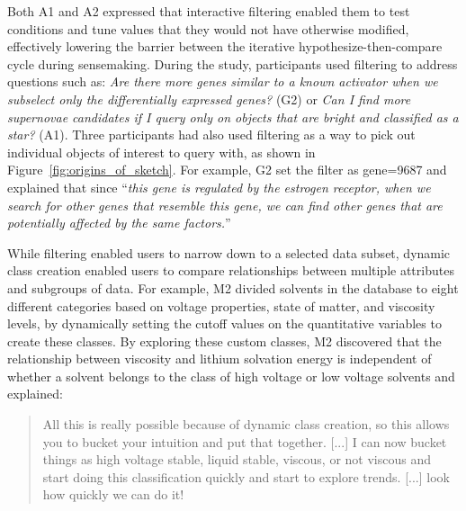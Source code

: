 \par Both A1 and A2 expressed that interactive filtering enabled them to test conditions and tune values that they would not have otherwise modified, effectively lowering the barrier between the iterative hypothesize-then-compare cycle during sensemaking.
During the study, participants used filtering to address questions such as: \textit{Are there more genes similar to a known activator when we subselect only the differentially expressed genes?} (G2) or \textit{Can I find more supernovae candidates if I query only on objects that are bright and classified as a star?} (A1). Three participants had also used filtering as a way to pick out individual objects of interest to query with, as shown in Figure~\ref{fig:origins_of_sketch}. For example, G2 set the filter as gene=9687 and explained that since ``\textit{this gene is regulated by the estrogen receptor, when we search for other genes that resemble this gene, we can find other genes that are potentially affected by the same factors.}''
\par While filtering enabled users to narrow down to a selected data subset, dynamic class creation enabled users to compare relationships between multiple attributes and subgroups of data. For example, M2 divided solvents in the database to eight different categories based on voltage properties, state of matter, and viscosity levels, by dynamically setting the cutoff values on the quantitative variables to create these classes. By exploring these custom classes, M2 discovered that the relationship between viscosity and lithium solvation energy is independent of whether a solvent belongs to the class of high voltage or low voltage solvents and explained:%
\begin{quote}
All this is really possible because of dynamic class creation, so this allows you to bucket your intuition and put that together. [...] I can now bucket things as high voltage stable, liquid stable, viscous, or not viscous and start doing this classification quickly and start to explore trends. [...] look how quickly we can do it!%
\end{quote}
